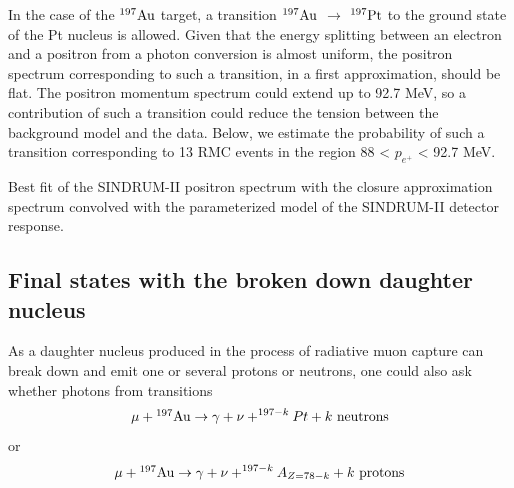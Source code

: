 \documentclass[12pt]{article}
\newcommand {\ra}        {\rightarrow}
\newcommand {\Au}[1]     {\mbox{$\rm ^{#1}Au$}}                 %
\begin{document}
In the case of the \Au{197} target, a transition \Au{197} $\ra$ $^{197} \rm Pt$ to
the ground state of the Pt nucleus is allowed. Given that the energy splitting between
an electron and a positron from a photon conversion is almost uniform,
the positron spectrum corresponding to such a transition, in a first approximation,
should be flat. The positron momentum spectrum could extend up to 92.7 MeV, so a contribution
of such a transition could reduce the tension between the background model and the data.
Below, we estimate the probability of such a transition corresponding to 13 RMC events
in the region 88 < $p_{e^+}$ < 92.7 MeV.

\vspace{0.1in}
 {
  \label{fig:ana_step2_ppos_best_fit}
  Best fit of the SINDRUM-II positron spectrum with the closure approximation
  spectrum convolved with the parameterized model of the SINDRUM-II detector
  response.
}
\vspace{0.1in}

\subsection{Final states with the broken down daughter nucleus}

As a daughter nucleus produced in the process of radiative muon capture can
break down and emit one or several protons or neutrons, one could also ask
whether photons from transitions
$$
\mu + \Au{197} \rightarrow \gamma + \nu + ^{197-k}Pt + k \rm ~neutrons
$$
or 
$$
\mu + \Au{197} \rightarrow \gamma + \nu + ^{197-k}A_{Z=78-k} + k \rm ~protons
$$
\end{document}
